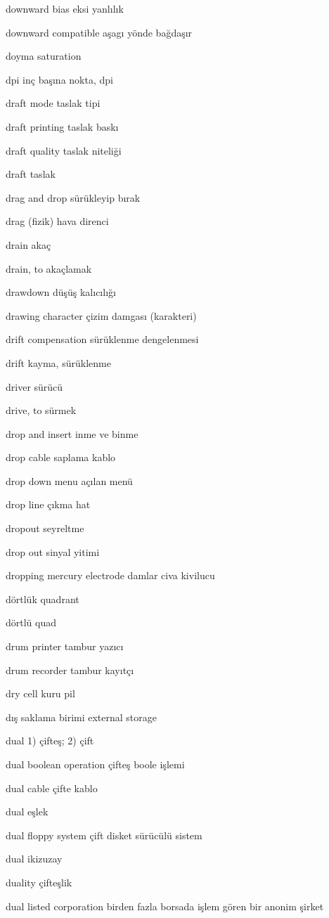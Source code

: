 \documentclass[12pt,fleqn]{article}\usepackage{../../common}
\begin{document}
downward bias eksi yanlılık

downward compatible aşagı yönde bağdaşır

doyma saturation

dpi inç başına nokta, dpi

draft mode taslak tipi

draft printing taslak baskı

draft quality taslak niteliği

draft taslak

drag and drop sürükleyip bırak

drag (fizik) hava direnci 

drain akaç

drain, to akaçlamak

drawdown düşüş kalıcılığı

drawing character çizim damgası (karakteri)

drift compensation sürüklenme dengelenmesi

drift kayma, sürüklenme

driver sürücü

drive, to sürmek

drop and insert inme ve binme

drop cable saplama kablo

drop down menu açılan menü

drop line çıkma hat

dropout seyreltme

drop out sinyal yitimi

dropping mercury electrode damlar civa kivilucu

dörtlük quadrant

dörtlü quad

drum printer tambur yazıcı

drum recorder tambur kayıtçı

dry cell kuru pil

dış saklama birimi external storage

dual 1) çifteş; 2) çift

dual boolean operation çifteş boole işlemi

dual cable çifte kablo

dual eşlek

dual floppy system çift disket sürücülü sistem

dual ikizuzay

duality çifteşlik

dual listed corporation birden fazla borsada işlem gören bir anonim şirket
\end{document}

